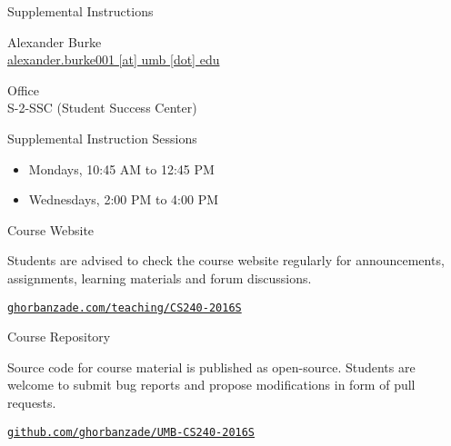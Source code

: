 \documentclass[compress]{beamer}
\begin{document}
\begin{slide}
	\begin{block}{Supplemental Instructions}
		
	Alexander Burke\\
	\href{mailto:alexander.burke001@umb.edu}{alexander.burke001 [at] umb [dot] edu}

	\par
	\vspace{0.5em}
	{\large Office}\\
	S-2-SSC (Student Success Center)

	\par
	\vspace{0.5em}
	{\large Supplemental Instruction Sessions}
	\begin{itemize}
	\item[] Mondays, 10:45 AM to 12:45 PM
	\item[] Wednesdays, 2:00 PM to 4:00 PM
	\end{itemize}

	\end{block}
\end{slide}

\begin{slide}
	\begin{block}{Course Website}

	Students are advised to check the course website regularly for announcements, assignments, learning materials and forum discussions.

	\begin{center}
	\href{http://ghorbanzade.com/teaching/cs240-2016s}{\texttt{ghorbanzade.com/teaching/CS240-2016S}}
	\end{center}

	\end{block}
\end{slide}

\begin{slide}
	\begin{block}{Course Repository}

	Source code for course material is published as open-source.
	Students are welcome to submit bug reports and propose modifications in form of pull requests.

	\begin{center}
	\href{https://github.com/ghorbanzade/umb-cs240-2016s}{\texttt{github.com/ghorbanzade/UMB-CS240-2016S}}
	\end{center}

	\end{block}
\end{slide}
\end{document}
